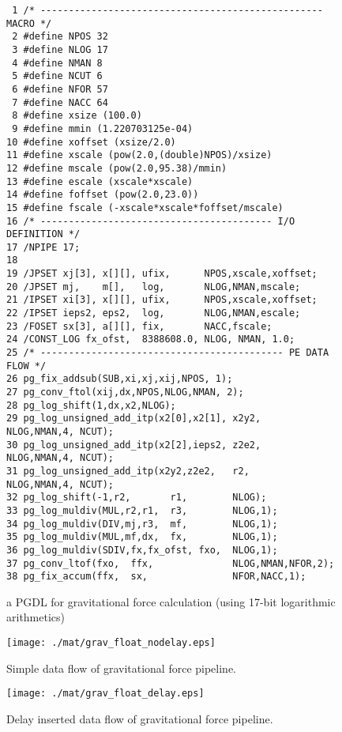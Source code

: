 \documentclass[times, 10pt,twocolumn]{article}
\begin{document}
\begin{figure}
\scriptsize
{\tiny
\begin{verbatim}
 1 /* -------------------------------------------------- MACRO */
 2 #define NPOS 32
 3 #define NLOG 17
 4 #define NMAN 8
 5 #define NCUT 6
 6 #define NFOR 57
 7 #define NACC 64
 8 #define xsize (100.0)
 9 #define mmin (1.220703125e-04)
10 #define xoffset (xsize/2.0)
11 #define xscale (pow(2.0,(double)NPOS)/xsize)
12 #define mscale (pow(2.0,95.38)/mmin)
13 #define escale (xscale*xscale)
14 #define foffset (pow(2.0,23.0))
15 #define fscale (-xscale*xscale*foffset/mscale)
16 /* ----------------------------------------- I/O DEFINITION */
17 /NPIPE 17;
18
19 /JPSET xj[3], x[][], ufix,      NPOS,xscale,xoffset;
20 /JPSET mj,    m[],   log,       NLOG,NMAN,mscale;
21 /IPSET xi[3], x[][], ufix,      NPOS,xscale,xoffset;
22 /IPSET ieps2, eps2,  log,       NLOG,NMAN,escale;
23 /FOSET sx[3], a[][], fix,       NACC,fscale;
24 /CONST_LOG fx_ofst,  8388608.0, NLOG, NMAN, 1.0;
25 /* ------------------------------------------- PE DATA FLOW */
26 pg_fix_addsub(SUB,xi,xj,xij,NPOS, 1);
27 pg_conv_ftol(xij,dx,NPOS,NLOG,NMAN, 2);
28 pg_log_shift(1,dx,x2,NLOG);
29 pg_log_unsigned_add_itp(x2[0],x2[1], x2y2,   NLOG,NMAN,4, NCUT);
30 pg_log_unsigned_add_itp(x2[2],ieps2, z2e2,   NLOG,NMAN,4, NCUT);
31 pg_log_unsigned_add_itp(x2y2,z2e2,   r2,     NLOG,NMAN,4, NCUT);
32 pg_log_shift(-1,r2,       r1,        NLOG);
33 pg_log_muldiv(MUL,r2,r1,  r3,        NLOG,1);
34 pg_log_muldiv(DIV,mj,r3,  mf,        NLOG,1);
35 pg_log_muldiv(MUL,mf,dx,  fx,        NLOG,1);
36 pg_log_muldiv(SDIV,fx,fx_ofst, fxo,  NLOG,1);
37 pg_conv_ltof(fxo,  ffx,              NLOG,NMAN,NFOR,2);
38 pg_fix_accum(ffx,  sx,               NFOR,NACC,1);
\end{verbatim}
}
\caption{a PGDL for gravitational force calculation (using 17-bit logarithmic arithmetics)}
\label{figgrav5_pgdl}
\end{figure}

\begin{figure}[htb]
\begin{center}
\texttt{[image: ./mat/grav\_float\_nodelay.eps]}
\caption{Simple data flow of gravitational force pipeline.}
\label{fig_grav_float_nodelay}
\end{center}
\end{figure}

\begin{figure}[htb]
\begin{center}
\texttt{[image: ./mat/grav\_float\_delay.eps]}
\caption{Delay inserted data flow of gravitational force pipeline.}
\label{fig_grav_float_delay}
\end{center}
\end{figure}
\end{document}
